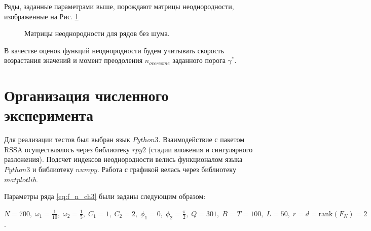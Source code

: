 \documentclass[specialist, substylefile = spbu.rtx,
			   subf, href, 12pt]{disser}
\begin{document}
Ряды, заданные параметрами выше, порождают матрицы неоднородности, изображенные на Рис. \ref{pic:heterogeneity_types}
\begin{figure}[!hhh]
	\caption{Матрицы неоднородности для рядов без шума.}
	\label{pic:heterogeneity_types}
\end{figure}


В качестве оценок функций неоднородности будем учитывать скорость возрастания значений и момент преодоления $n_{overcome}$ заданного порога $\gamma^*$.


\section{Организация численного эксперимента}
Для реализации \cite{Kononykhin2022} тестов был выбран язык $Python3$. Взаимодействие с пакетом $\mathrm{RSSA}$ \cite{rssa_package, RSSA_BASIC, RSSA, RSSA_MULTIVATIATE} осуществлялось через библиотеку $rpy2$ (стадии вложения и сингулярного разложения). Подсчет индексов неоднородности велись функционалом языка $Python3$ и библиотеку $numpy$. Работа с графикой велась через библиотеку $matplotlib$. 

Параметры ряда \eqref{eq:f_n_ch3} были заданы следующим образом: 

$ N = 700, \;\omega_1 = \frac{1}{10},\; \omega_2 = \frac{1}{5},\; C_1 = 1, \; C_2 = 2,\; \phi_1=0,\; \phi_2=\frac{\pi}{2},\; Q = 301,\; B = T = 100,\; L = 50,\; r=d=\mathrm{rank}(F_N)=2$.
\end{document}

